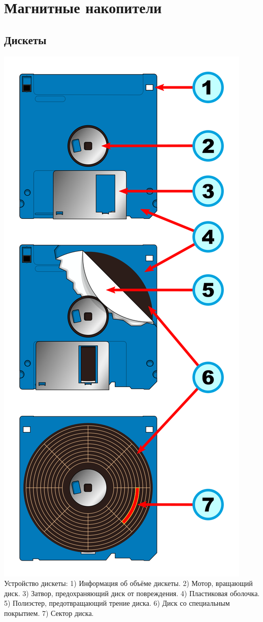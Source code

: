 \documentclass[12pt, a4paper]{article}
\begin{document}
\section{Магнитные накопители}

\subsection{Дискеты}

\begin{center}
{\includegraphics[scale=0.15]{./images/Floppy.png} \\ Устройство дискеты: 1) Информация об объёме дискеты. 2) Мотор, вращающий диск. 3) Затвор, предохраняющий диск от повреждения. 4) Пластиковая оболочка. 5) Полиэстер, предотвращающий трение диска. 6) Диск со специальным покрытием. 7) Сектор диска. }
\end{center}
\end{document}
